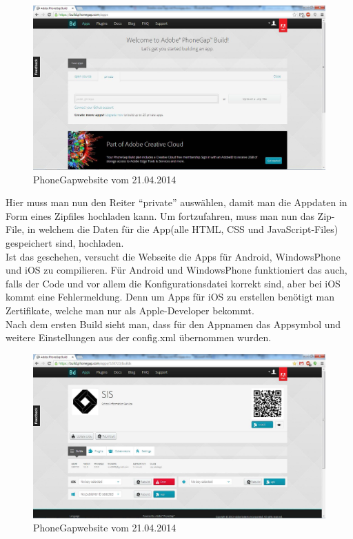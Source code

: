 \begin{figure}[H]
\includegraphics[keepaspectratio=true, width=14cm]{images/phoneGap/PhoneGap1.png}
\caption{PhoneGapwebsite vom 21.04.2014}
\end{figure}

Hier muss man nun den Reiter \enquote{private} auswählen, damit man die Appdaten in Form eines Zipfiles hochladen kann.
Um fortzufahren, muss man nun das Zip-File, in welchem die Daten für die App(alle HTML, CSS und JavaScript-Files) gespeichert sind, hochladen.\\
Ist das geschehen, versucht die Webseite die Apps für Android, WindowsPhone und iOS zu compilieren. Für Android und WindowsPhone funktioniert das auch, falls der Code und vor allem die Konfigurationsdatei korrekt sind, aber bei iOS kommt eine Fehlermeldung. Denn um Apps für iOS zu erstellen benötigt man Zertifikate, welche man nur als Apple-Developer bekommt.\\
Nach dem ersten Build sieht man, dass für den Appnamen das Appsymbol und weitere Einstellungen aus der config.xml übernommen wurden.\\

\begin{figure}[H]
\includegraphics[keepaspectratio=true, width=14cm]{images/phoneGap/PhoneGap2.png}
\caption{PhoneGapwebsite vom 21.04.2014}
\end{figure}

